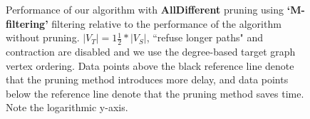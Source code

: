 \begin{figure}
\begin{subfigure} {0.5\linewidth}

\end{subfigure}

\caption{Performance of our algorithm with \textbf{AllDifferent} pruning using \textbf{`M-filtering'} filtering relative to the performance of the algorithm without pruning. $|V_T|=1\frac{1}{2}*|V_S|$, ``refuse longer paths" and contraction are disabled and we use the degree-based target graph vertex ordering. Data points above the black reference line denote that the pruning method introduces more delay, and data points below the reference line denote that the pruning method saves time. Note the logarithmic y-axis.}		
\label{fig:alldifferentMfiltering}
\end{figure}
